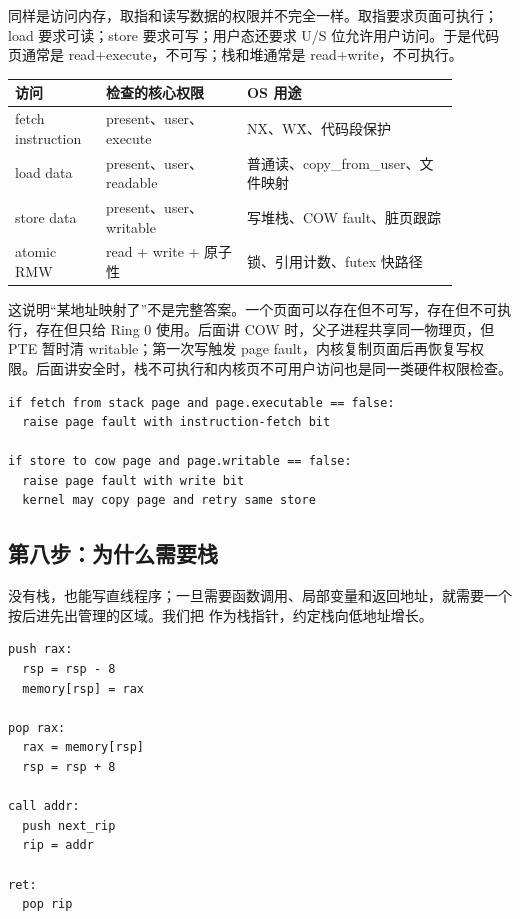 同样是访问内存，取指和读写数据的权限并不完全一样。取指要求页面可执行；load 要求可读；store 要求可写；用户态还要求 U/S 位允许用户访问。于是代码页通常是 read+execute，不可写；栈和堆通常是 read+write，不可执行。

\begin{longtable}{p{0.18\linewidth}p{0.28\linewidth}p{0.42\linewidth}}
\toprule
访问 & 检查的核心权限 & OS 用途 \\
\midrule
fetch instruction & present、user、execute & NX、W\^X、代码段保护 \\
load data & present、user、readable & 普通读、copy\_from\_user、文件映射 \\
store data & present、user、writable & 写堆栈、COW fault、脏页跟踪 \\
atomic RMW & read + write + 原子性 & 锁、引用计数、futex 快路径 \\
\bottomrule
\end{longtable}

这说明“某地址映射了”不是完整答案。一个页面可以存在但不可写，存在但不可执行，存在但只给 Ring 0 使用。后面讲 COW 时，父子进程共享同一物理页，但 PTE 暂时清 writable；第一次写触发 page fault，内核复制页面后再恢复写权限。后面讲安全时，栈不可执行和内核页不可用户访问也是同一类硬件权限检查。

\begin{lstlisting}
if fetch from stack page and page.executable == false:
  raise page fault with instruction-fetch bit

if store to cow page and page.writable == false:
  raise page fault with write bit
  kernel may copy page and retry same store
\end{lstlisting}

\subsection{第八步：为什么需要栈}

没有栈，也能写直线程序；一旦需要函数调用、局部变量和返回地址，就需要一个按后进先出管理的区域。我们把  作为栈指针，约定栈向低地址增长。

\begin{lstlisting}
push rax:
  rsp = rsp - 8
  memory[rsp] = rax

pop rax:
  rax = memory[rsp]
  rsp = rsp + 8

call addr:
  push next_rip
  rip = addr

ret:
  pop rip
\end{lstlisting}


